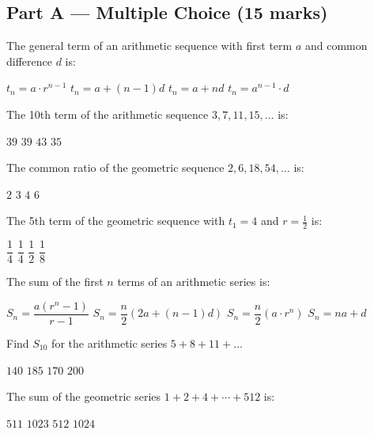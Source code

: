 \documentclass[addpoints]{exam}
\begin{document}
\newpage
\begin{questions}

\section*{Part A --- Multiple Choice (15 marks)}
\vspace{5mm}

\question[1] The general term of an arithmetic sequence with first term $a$ and
common difference $d$ is:
\begin{choices}
    \choice $t_n = a \cdot r^{n-1}$
    \correctchoice $t_n = a + (n-1)d$
    \choice $t_n = a + nd$
    \choice $t_n = a^{n-1} \cdot d$
\end{choices}

\question[1] The 10th term of the arithmetic sequence $3, 7, 11, 15, \ldots$ is:
\begin{choices}
    \choice $39$
    \correctchoice $39$
    \choice $43$
    \choice $35$
\end{choices}

\question[1] The common ratio of the geometric sequence $2, 6, 18, 54, \ldots$ is:
\begin{choices}
    \choice $2$
    \correctchoice $3$
    \choice $4$
    \choice $6$
\end{choices}

\question[1] The 5th term of the geometric sequence with $t_1 = 4$ and $r = \tfrac{1}{2}$
is:
\begin{choices}
    \choice $\dfrac{1}{4}$
    \correctchoice $\dfrac{1}{4}$
    \choice $\dfrac{1}{2}$
    \choice $\dfrac{1}{8}$
\end{choices}

\question[1] The sum of the first $n$ terms of an arithmetic series is:
\begin{choices}
    \choice $S_n = \dfrac{a(r^n - 1)}{r - 1}$
    \correctchoice $S_n = \dfrac{n}{2}(2a + (n-1)d)$
    \choice $S_n = \dfrac{n}{2}(a \cdot r^n)$
    \choice $S_n = na + d$
\end{choices}

\question[1] Find $S_{10}$ for the arithmetic series $5 + 8 + 11 + \ldots$
\begin{choices}
    \choice $140$
    \correctchoice $185$
    \choice $170$
    \choice $200$
\end{choices}

\question[1] The sum of the geometric series $1 + 2 + 4 + \cdots + 512$ is:
\begin{choices}
    \choice $511$
    \correctchoice $1023$
    \choice $512$
    \choice $1024$
\end{choices}


\end{questions}
\end{document}
